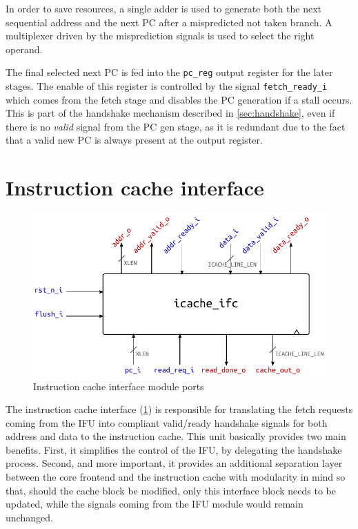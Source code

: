 In order to save resources, a single adder is used to generate both the next sequential address and the next \ac{PC} after a mispredicted not taken branch. A multiplexer driven by the misprediction signals is used to select the right operand.

The final selected next \ac{PC} is fed into the \texttt{pc\_reg} output register for the later stages. The enable of this register is controlled by the signal \texttt{fetch\_ready\_i} which comes from the fetch stage and disables the \ac{PC} generation if a stall occurs. This is part of the handshake mechanism described in \cref{sec:handshake}, even if there is no \emph{valid} signal from the \ac{PC} gen stage, as it is redundant due to the fact that a valid new \ac{PC} is always present at the output register.

\section{Instruction cache interface}
\begin{figure}[hbt]
  \centering
  \includegraphics{img/icache_ifc-top.pdf}
  \caption{Instruction cache interface module ports}
  \label{fig:icache_ifc-top}
\end{figure}
The instruction cache interface (\cref{fig:icache_ifc-top}) is responsible for translating the fetch requests coming from the \ac{IFU} into compliant valid/ready handshake signals for both address and data to the instruction cache. This unit basically provides two main benefits. First, it simplifies the control of the \ac{IFU}, by delegating the handshake process. Second, and more important, it provides an additional separation layer between the core frontend and the instruction cache with modularity in mind so that, should the cache block be modified, only this interface block needs to be updated, while the signals coming from the \ac{IFU} module would remain unchanged.

